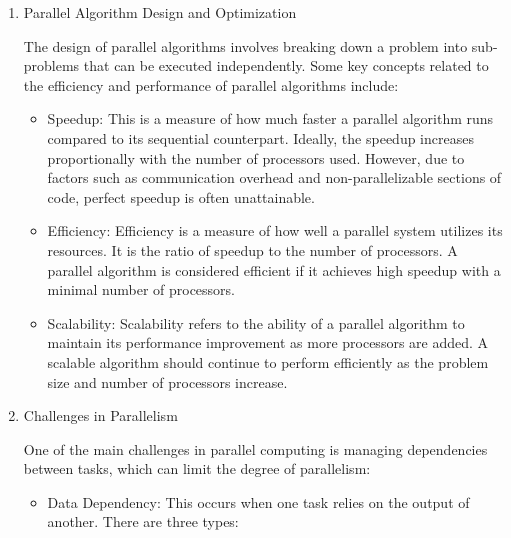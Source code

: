 \documentclass[a4paper, 10pt]{book}
\begin{document}
\begin{enumerate}
\begin{itemize}
                \end{itemize}

            \item {\bold Parallel Algorithm Design and Optimization}
            
                The design of parallel algorithms involves breaking down a problem into sub-problems that can be executed independently. Some key concepts related to the efficiency and performance of parallel algorithms include:

                \begin{itemize}
                    
                    \item {\bold Speedup:} This is a measure of how much faster a parallel algorithm runs compared to its sequential counterpart. Ideally, the speedup increases proportionally with the number of processors used. However, due to factors such as communication overhead and non-parallelizable sections of code, perfect speedup is often unattainable.

                    \item {\bold Efficiency:} Efficiency is a measure of how well a parallel system utilizes its resources. It is the ratio of speedup to the number of processors. A parallel algorithm is considered efficient if it achieves high speedup with a minimal number of processors.

                    \item {\bold Scalability:} Scalability refers to the ability of a parallel algorithm to maintain its performance improvement as more processors are added. A scalable algorithm should continue to perform efficiently as the problem size and number of processors increase.

                \end{itemize}
            
            \item {\bold Challenges in Parallelism}
            
                One of the main challenges in parallel computing is managing dependencies between tasks, which can limit the degree of parallelism:

                \begin{itemize}
                    
                    \item {\bold Data Dependency:} This occurs when one task relies on the output of another. There are three types:
                    

\end{itemize}
\end{enumerate}
\end{document}
